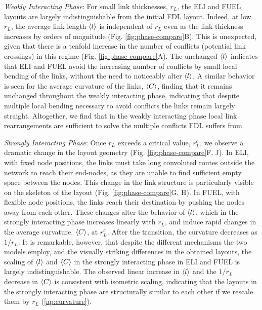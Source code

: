 \documentclass[linenumbers,endfloats,nofootinbib,preprint,floatfix,titlepage,superscriptaddress]{revtex4-1} %
\begin{document}
{\em Weakly Interacting Phase}: For small link thicknesses, $r_L$, the ELI and FUEL layouts are largely indistinguishable from the initial FDL layout.
Indeed, at low $r_L$, the average link length $\left<l\right>$ is independent of $r_L$ even as the link thickness increases by orders of magnitude (Fig. \ref{fig:phase-compare}B).
This is unexpected, given that there is a tenfold increase in the number of  conflicts (potential link crossings) in this regime (Fig. \ref{fig:phase-compare}A). %
The unchanged $\left<l\right>$ indicates that ELI and FUEL avoid the increasing number of conflicts by small local bending of the links, without the need to noticeably alter $\left<l\right>$.
A similar behavior is seen for the average curvature of the links, $\left<C\right>$, finding that it remains unchanged throughout the weakly interacting phase, indicating that despite multiple local bending necessary to avoid conflicts the links remain largely straight. 
Altogether, we find that in the weakly interacting phase local link rearrangements are sufficient to solve the multiple conflicts FDL suffers from. 

{\em Strongly Interacting Phase}: Once  $r_L$ exceeds a critical value, $r_L^c$, we observe a dramatic change in the layout geometry (Fig. \ref{fig:phase-compare}F, J). 
In ELI, with fixed node positions, the links must take long convoluted routes outside the network to reach their end-nodes, as they are unable to find sufficient empty space between the nodes.  
This change in the link structure is particularly visible on the skeleton of the layout (Fig. \ref{fig:phase-compare}G, H).
In FUEL, with flexible node positions, the links reach their destination by pushing the nodes away from each other. 
These changes alter the behavior of $\left<l\right>$, which in the strongly interacting phase increases linearly with $r_L$,  
and induce rapid changes in the average curvature, $\left<C\right>$,  at $r^c_L$. %
After the transition, the curvature decreases as $1/r_L$. 
It is remarkable, however, that despite the different mechanisms the two models employ, and the visually striking differences in the obtained layouts, the scaling of $\left<l\right>$ and $\left<C\right>$ in the strongly interacting phase in ELI and FUEL is largely indistinguishable. 
The observed linear increase in $\left<l\right>$ and the $1/r_L$ decrease in $\left<C\right>$ is consistent with isometric scaling, indicating that the layouts in the strongly interacting phase are structurally similar to each other if we rescale them by $r_L$ %
(\ref{ap:curvature}). 
\end{document}
